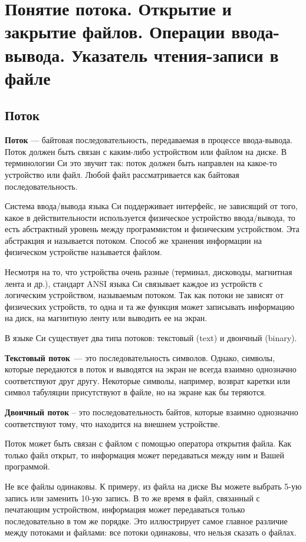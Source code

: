 \section{Понятие потока. Открытие и закрытие файлов. Операции ввода- вывода. Указатель чтения-записи в файле}
\subsection{Поток}
\textbf{Поток} --- байтовая последовательность, передаваемая в процессе ввода-вывода.
Поток должен быть связан с каким-либо устройством или файлом на диске. В терминологии Си это звучит так:
поток должен быть направлен на какое-то устройство или файл. Любой файл рассматривается как байтовая последовательность.

Система ввода/вывода языка Си поддерживает интерфейс, не зависящий от того, какое в действительности используется физическое
устройство ввода/вывода, то есть абстрактный уровень между программистом и физическим устройством. Эта абстракция и называется
потоком. Способ же хранения информации на физическом устройстве называется файлом.

Несмотря на то, что устройства очень разные (терминал, дисководы, магнитная лента и др.), стандарт ANSI языка Си связывает каждое
из устройств с логическим устройством, называемым потоком. Так как потоки не зависят от физических устройств, то одна и та же функция
может записывать информацию на диск, на магнитную ленту или выводить ее на экран.

В языке Си существует два типа потоков: текстовый (text) и двоичный (binary).

\textbf{Текстовый поток}~--- это последовательность символов. Однако, символы, которые передаются в поток и выводятся на экран не всегда
взаимно однозначно соответствуют друг другу. Некоторые символы, например, возврат каретки или символ табуляции присутствуют в
файле, но на экране как бы теряются.

\textbf{Двоичный поток} – это последовательность байтов, которые взаимно однозначно соответствуют тому, что находится на внешнем устройстве.

Поток может быть связан с файлом с помощью оператора открытия файла. Как только файл открыт, то информация может передаваться между ним и Вашей программой.

Не все файлы одинаковы. К примеру, из файла на диске Вы можете выбрать 5-ую запись или заменить 10-ую запись.
В то же время в файл, связанный с печатающим устройством, информация может передаваться только последовательно
в том же порядке. Это иллюстрирует самое главное различие между потоками и файлами: все потоки одинаковы, что нельзя сказать о файлах.

